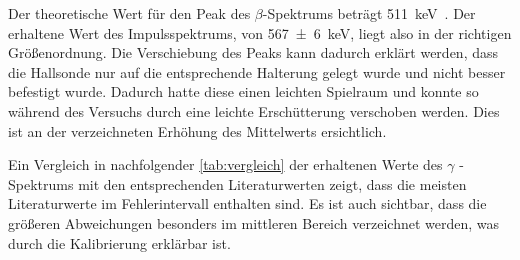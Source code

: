 \documentclass[12pt,english,ngerman]{scrartcl}
\begin{document}
Der theoretische Wert für den Peak des $\beta$-Spektrums beträgt
\SI{511}{\kilo\electronvolt}~\cite[]{leifi}. Der erhaltene Wert des
Impulsspektrums, von \SI{567(6)}{\kilo\electronvolt}, liegt also in der
richtigen Größenordnung. Die Verschiebung des Peaks kann dadurch erklärt
werden, dass die Hallsonde nur auf die entsprechende Halterung gelegt wurde und
nicht besser befestigt wurde. Dadurch hatte diese einen leichten Spielraum und
konnte so während des Versuchs durch eine leichte Erschütterung verschoben
werden. Dies ist an der verzeichneten Erhöhung des Mittelwerts ersichtlich.

Ein Vergleich in nachfolgender \autoref{tab:vergleich} der erhaltenen Werte des
$\gamma$ - Spektrums mit den entsprechenden Literaturwerten zeigt, dass die
meisten Literaturwerte im Fehlerintervall enthalten sind. Es ist auch sichtbar,
dass die größeren Abweichungen besonders im mittleren Bereich verzeichnet
werden, was durch die Kalibrierung erklärbar ist.
\end{document}
